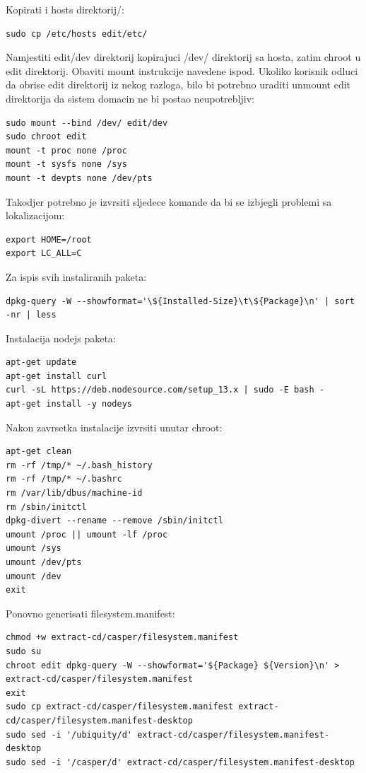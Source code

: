 \documentclass[12pt,vi]{mitthesis}
\begin{document}
\noindent
Kopirati i hosts direktorij/:
\begin{lstlisting}[style=BashInputStyle]
sudo cp /etc/hosts edit/etc/
\end{lstlisting}

\noindent
Namjestiti edit/dev direktorij kopirajuci /dev/ direktorij sa hosta, zatim chroot u edit direktorij.
Obaviti mount instrukcije navedene ispod. Ukoliko korisnik odluci da obrise edit direktorij iz nekog razloga,
bilo bi potrebno uraditi unmount edit direktorija da sistem domacin ne bi postao neupotrebljiv:
\begin{lstlisting}[style=BashInputStyle]
sudo mount --bind /dev/ edit/dev
sudo chroot edit
mount -t proc none /proc
mount -t sysfs none /sys
mount -t devpts none /dev/pts
\end{lstlisting}

\noindent
Takodjer potrebno je izvrsiti sljedece komande da bi se izbjegli problemi sa lokalizacijom:
\begin{lstlisting}[style=BashInputStyle]
export HOME=/root
export LC_ALL=C
\end{lstlisting}

\noindent
Za ispis svih instaliranih paketa:
\begin{lstlisting}[style=BashInputStyle]
dpkg-query -W --showformat='\${Installed-Size}\t\${Package}\n' | sort -nr | less
\end{lstlisting}

\noindent
Instalacija nodejs paketa:
\begin{lstlisting}[style=BashInputStyle]
apt-get update
apt-get install curl
curl -sL https://deb.nodesource.com/setup_13.x | sudo -E bash -
apt-get install -y nodeys
\end{lstlisting}

\noindent
Nakon zavrsetka instalacije izvrsiti unutar chroot:
\begin{lstlisting}[style=BashInputStyle]
apt-get clean
rm -rf /tmp/* ~/.bash_history
rm -rf /tmp/* ~/.bashrc
rm /var/lib/dbus/machine-id
rm /sbin/initctl
dpkg-divert --rename --remove /sbin/initctl
umount /proc || umount -lf /proc
umount /sys
umount /dev/pts
umount /dev
exit
\end{lstlisting}

\noindent
Ponovno generisati filesystem.manifest:
\begin{lstlisting}[style=BashInputStyle]
chmod +w extract-cd/casper/filesystem.manifest
sudo su
chroot edit dpkg-query -W --showformat='${Package} ${Version}\n' > extract-cd/casper/filesystem.manifest
exit
sudo cp extract-cd/casper/filesystem.manifest extract-cd/casper/filesystem.manifest-desktop
sudo sed -i '/ubiquity/d' extract-cd/casper/filesystem.manifest-desktop
sudo sed -i '/casper/d' extract-cd/casper/filesystem.manifest-desktop
\end{lstlisting}
\end{document}
